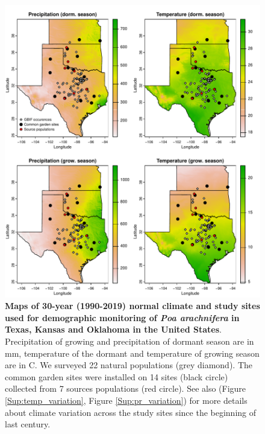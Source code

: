\documentclass[12pt]{article}
\begin{document}
\begin{figure}[H]
  \begin{center}
    \includegraphics[width=0.90\linewidth]{Figures/POAR_survey_garden_map.pdf}
  \caption{\textbf{Maps of 30-year (1990-2019) normal climate and study sites used for demographic monitoring of \emph{Poa arachnifera} in Texas, Kansas and Oklahoma in the United States}.
  Precipitation of growing and precipitation of dormant season are in mm, temperature of the dormant and temperature of growing season are in \degree C.
  We surveyed 22 natural populations (grey diamond).
  The common garden sites were installed on 14 sites (black circle) collected from 7 sources populations (red circle).
  See also (Figure \ref{Sup:temp_variation}, Figure \ref{Sup:pr_variation}) for more details about climate variation across the study sites since the beginning of last century.}
  \label{fig:study_design}
  \end{center}
\end{figure}
\end{document}
